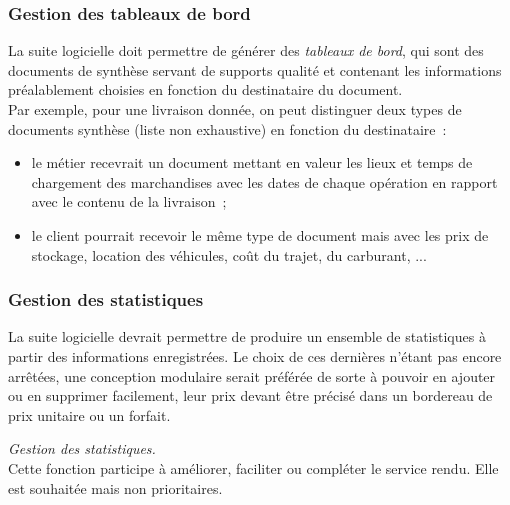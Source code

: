 \subsubsection{Gestion des tableaux de bord}
La suite logicielle doit permettre de générer des \emph{tableaux de bord}, qui sont des documents de synthèse servant de supports qualité et contenant les informations préalablement choisies en fonction du destinataire du document.
\\
Par exemple, pour une livraison donnée, on peut distinguer deux types de documents synthèse (liste non exhaustive) en fonction du destinataire~:
\begin{itemize}
	\item le métier recevrait un document mettant en valeur les lieux et temps de chargement des marchandises avec les dates de chaque opération en rapport avec le contenu de la livraison~;
	\item le client pourrait recevoir le même type de document mais avec les prix de stockage, location des véhicules, coût du trajet, du carburant, ...
\end{itemize}

\subsubsection{Gestion des statistiques}
La suite logicielle devrait permettre de produire un ensemble de statistiques à partir des informations enregistrées. Le choix de ces dernières n'étant pas encore arrêtées, une conception modulaire serait préférée de sorte à pouvoir en ajouter ou en supprimer facilement, leur prix devant être précisé dans un bordereau de prix unitaire ou un forfait.
\begin{notation}
	\emph{Gestion des statistiques.}
	\\
	Cette fonction participe à améliorer, faciliter ou compléter le service rendu. Elle est souhaitée mais non prioritaires.
\end{notation}

